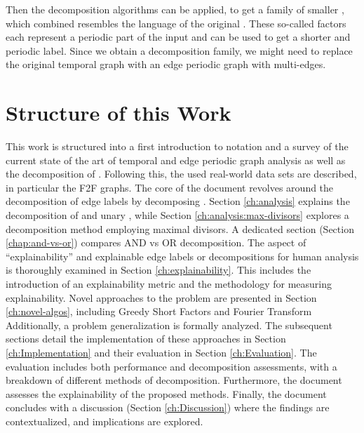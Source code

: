 Then the \DFA decomposition algorithms can be applied, to get a family of smaller \DFAs, which combined resembles the language of the original \DFA.
These so-called factors each represent a periodic part of the input and can be used to get a shorter and periodic label.
Since we obtain a decomposition family, we might need to replace the original temporal graph with an edge periodic graph with multi-edges. 

\section{Structure of this Work}
\label{ch:Intoduction:sec:Structure}
This work is structured into a first introduction to notation and a survey of the current state of the art of temporal and edge periodic graph analysis as well as the decomposition of \DFAs.
Following this, the used real-world data sets are described, in particular the F2F graphs.
The core of the document revolves around the decomposition of edge labels by decomposing \DFAs.
Section \ref{ch:analysis} explains the decomposition of \DFAs and unary \DFAs, while Section \ref{ch:analysis:max-divisors} explores a decomposition method employing maximal divisors.
A dedicated section (Section \ref{chap:and-vs-or}) compares AND vs OR decomposition.
The aspect of \enquote{explainability} and explainable edge labels or decompositions for human analysis is thoroughly examined in Section \ref{ch:explainability}.
This includes the introduction of an explainability metric and the methodology for measuring explainability.
Novel approaches to the problem are presented in Section \ref{ch:novel-algos}, including Greedy Short Factors and Fourier Transform 
Additionally, a problem generalization is formally analyzed.
The subsequent sections detail the implementation of these approaches in Section \ref{ch:Implementation} and their evaluation in Section \ref{ch:Evaluation}.
The evaluation includes both performance and decomposition assessments, with a breakdown of different methods of decomposition.
Furthermore, the document assesses the explainability of the proposed methods.
Finally, the document concludes with a discussion (Section \ref{ch:Discussion}) where the findings are contextualized, and implications are explored.






